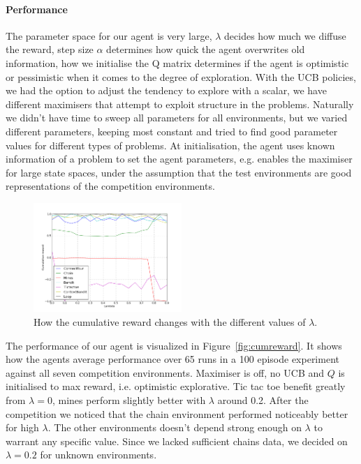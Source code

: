 \paragraph{Performance}
The parameter space for our agent is very large, $\lambda$ decides how much we
diffuse the reward, step size $\alpha$ determines how quick the agent overwrites
old information, how we initialise the Q matrix determines if the agent is
optimistic or pessimistic when it comes to the degree of exploration. With the
UCB policies, we had the option to adjust the tendency to explore with a scalar,
we have different maximisers that attempt to exploit structure in the problems.
Naturally we didn't have time to sweep all parameters for all environments, but
we varied different parameters, keeping most constant and tried to find good
parameter values for different types of problems. At initialisation, the agent
uses known information of a problem to set the agent parameters, e.g. enables
the maximiser for large state spaces, under the assumption that the test
environments are good representations of the competition environments.

\begin{figure}[h]
    \centering
    \includegraphics[width=0.5\textwidth]{../data/lambdasweepplot.png}
    \caption{How the cumulative reward changes with the different values of $\lambda$.}
    \label{fig:lambdasweep}
\end{figure}
The performance of our agent is visualized in Figure~\ref{fig:cumreward}. It shows how the agents average performance over 65 runs
in a 100 episode experiment against all seven competition environments. Maximiser is off, no UCB and $Q$ is initialised to max reward, i.e. optimistic explorative. Tic tac toe benefit greatly from $\lambda= 0$, mines perform slightly better with $\lambda$ around 0.2. After the competition we noticed that the chain environment performed noticeably better for high $\lambda$. The other environments doesn't depend strong enough on $\lambda$ to warrant any specific value. Since we lacked sufficient chains data, we decided on $\lambda = 0.2$ for unknown environments.

